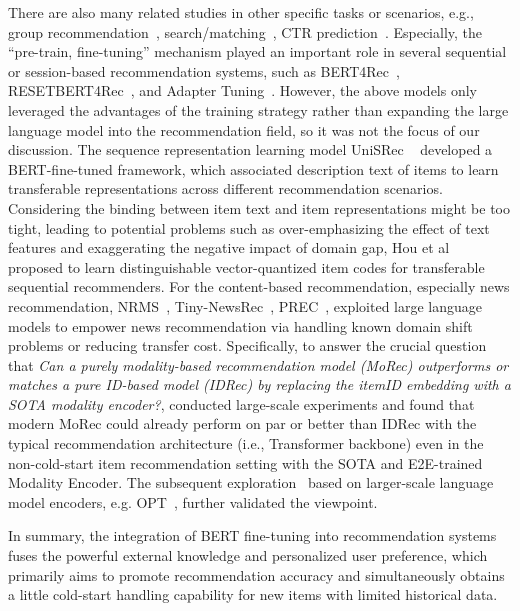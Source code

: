 \documentclass[sn-mathphys-num]{sn-jnl}%
\theoremstyle{thmstyleone}%
\theoremstyle{thmstyletwo}%
\theoremstyle{thmstylethree}%
\begin{document}
There are also many related studies in other specific tasks or scenarios, e.g., group recommendation~\cite{zhang2022gbert}, search/matching~\cite{yao2022reprbert}, CTR prediction~\cite{muhamed2021ctr}. Especially, the ``pre-train, fine-tuning'' mechanism played an important role in several sequential or session-based recommendation systems, such as BERT4Rec~\cite{Sun:2019:BSR:3357384.3357895}, RESETBERT4Rec~\cite{zhao2022resetbert4rec}, and Adapter Tuning~\cite{fu2023exploring,hu2024enhancing}. However, the above models only leveraged the advantages of the training strategy rather than expanding the large language model into the recommendation field, so it was not the focus of our discussion. 
The sequence representation learning model UniSRec ~\cite{hou2022towards} developed a BERT-fine-tuned framework, which associated description text of items to learn transferable representations across different recommendation scenarios. Considering the binding between item text and item representations might be too tight, leading to potential problems such as over-emphasizing the effect of text features and exaggerating the negative impact of domain gap, Hou et al~\cite{houlearningv} proposed to learn distinguishable vector-quantized item codes for transferable sequential recommenders.
For the content-based recommendation, especially news recommendation, NRMS~\cite{wu2021empowering}, Tiny-NewsRec~\cite{yu2022tiny}, PREC~\cite{liu2022boosting}, exploited large language models to empower news recommendation via handling known domain shift problems or reducing transfer cost. Specifically, to answer the crucial question that \emph{Can a purely modality-based recommendation model (MoRec) outperforms or matches a pure ID-based model (IDRec) by replacing the itemID embedding with a SOTA modality encoder?}, \cite{yuan2023go} conducted large-scale experiments and found that modern MoRec could already perform on par or better than IDRec with the typical recommendation architecture (i.e., Transformer backbone) even in the non-cold-start item recommendation setting with the SOTA and E2E-trained Modality Encoder. The subsequent exploration~\cite{li2023exploring} based on larger-scale language model encoders, e.g. OPT~\cite{zhang2022opt}, further validated the viewpoint.

In summary, the integration of BERT fine-tuning into recommendation systems fuses the powerful external knowledge and personalized user preference, which primarily aims to promote recommendation accuracy and simultaneously obtains a little cold-start handling capability for new items with limited historical data.
\end{document}
